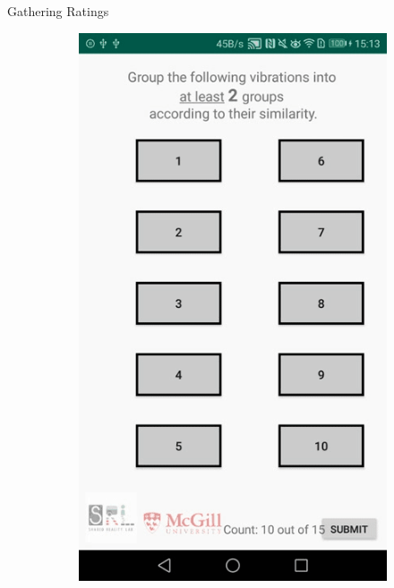 \begin{frame}{Gathering Ratings}
\begin{figure}[!htb]
\begin{subfigure}{.24\textwidth}
  \includegraphics[width=\linewidth]{Images/4.png}
\end{subfigure}
\label{fig:app_process_grouping}
\end{figure}


\end{frame}
